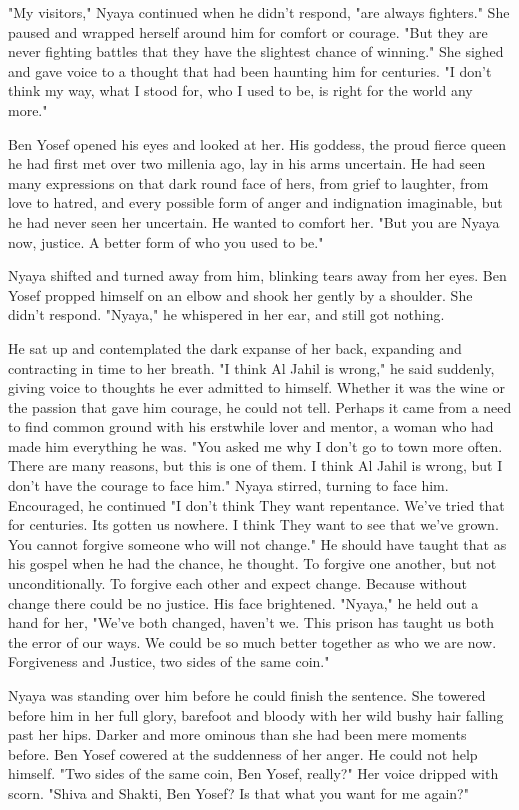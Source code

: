 \documentclass{amsart}
\begin{document}
"My visitors," Nyaya continued when he didn't respond, "are always fighters." She paused and wrapped herself around him for comfort or courage. "But they are never fighting battles that they have the slightest chance of winning." She sighed and gave voice to a thought that had been haunting him for centuries. "I don't think my way, what I stood for, who I used to be, is right for the world any more."

Ben Yosef opened his eyes and looked at her. His goddess, the proud fierce queen he had first met over two millenia ago, lay in his arms uncertain. He had seen many expressions on that dark round face of hers, from grief to laughter, from love to hatred, and every possible form of anger and indignation imaginable, but he had never seen her uncertain. He wanted to comfort her. "But you are Nyaya now, justice. A better form of who you used to be." 

Nyaya shifted and turned away from him, blinking tears away from her eyes. Ben Yosef propped himself on an elbow and shook her gently by a shoulder. She didn't respond. "Nyaya," he whispered in her ear, and still got nothing. 

He sat up and contemplated the dark expanse of her back, expanding and contracting in time to her breath. "I think Al Jahil is wrong," he said suddenly, giving voice to thoughts he ever admitted to himself. Whether it was the wine or the passion that gave him courage, he could not tell. Perhaps it came from a need to find common ground with his erstwhile lover and mentor, a woman who had made him everything he was. "You asked me why I don't go to town more often. There are many reasons, but this is one of them. I think Al Jahil is wrong, but I don't have the courage to face him." Nyaya stirred, turning to face him. Encouraged, he continued "I don't think They want repentance. We've tried that for centuries. Its gotten us nowhere. I think They want to see that we've grown. You cannot forgive someone who will not change." He should have taught that as his gospel when he had the chance, he thought. To forgive one another, but not unconditionally. To forgive each other and expect change. Because without change there could be no justice. His face brightened. "Nyaya," he held out a hand for her, "We've both changed, haven't we. This prison has taught us both the error of our ways. We could be so much better together as who we are now. Forgiveness and Justice, two sides of the same coin." 

Nyaya was standing over him before he could finish the sentence. She towered before him in her full glory, barefoot and bloody with her wild bushy hair falling past her hips. Darker and more ominous than she had been mere moments before. Ben Yosef cowered at the suddenness of her anger. He could not help himself. "Two sides of the same coin, Ben Yosef, really?" Her voice dripped with scorn. "Shiva and Shakti, Ben Yosef? Is that what you want for me again?"
\end{document}
